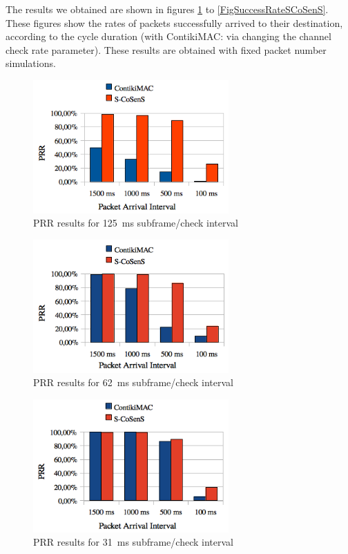 \documentclass[conference]{IEEEtran}
\begin{document}
The results we obtained are shown in figures \ref{FigSuccessRate8Hz} to
\ref{FigSuccessRateSCoSenS}. These figures show the rates of packets
successfully arrived to their destination, according to the cycle
duration (with ContikiMAC: via changing the channel check rate parameter).
These results are obtained with fixed packet number simulations.

\begin{figure}
  \centering
  \includegraphics[width=7.5cm]{graphes/PRR8Hz.png}
  \caption{PRR results for 125~ms subframe/check interval}
  \label{FigSuccessRate8Hz}
\end{figure}
\begin{figure}
  \centering
  \includegraphics[width=7.5cm]{graphes/PRR16Hz.png}
  \caption{PRR results for 62~ms subframe/check interval}
  \label{FigSuccessRate16Hz}
\end{figure}
\begin{figure}
  \centering
  \includegraphics[width=7.5cm]{graphes/PRR32Hz.png}
  \caption{PRR results for 31~ms subframe/check interval}
  \label{FigSuccessRate32Hz}
\end{figure}
\end{document}
